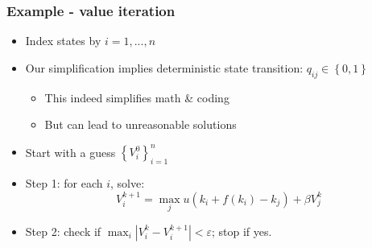 \documentclass[bigger,handout]{beamer}
\begin{document}
\begin{frame}%

\frametitle{Example - value iteration}

\begin{itemize}
\item Index states by $i=1,...,n$

\item Our simplification implies deterministic state transition: $q_{ij}\in
\left\{ 0,1\right\} $

\begin{itemize}
\item This indeed simplifies math \& coding

\item But can lead to unreasonable solutions
\end{itemize}

\item Start with a guess $\left\{ V_{i}^{0}\right\} _{i=1}^{n}$

\item Step 1: for each $i$, solve:%
\begin{equation}
V_{i}^{k+1}=\max_{j}u(k_{i}+f(k_{i})-k_{j})+\beta V_{j}^{k}  \label{eq:ExGJ}
\end{equation}

\item Step 2: check if $\max_{i}\left\vert V_{i}^{k}-V_{i}^{k+1}\right\vert
<\varepsilon $; stop if yes.
\end{itemize}



\end{frame}%
\end{document}
